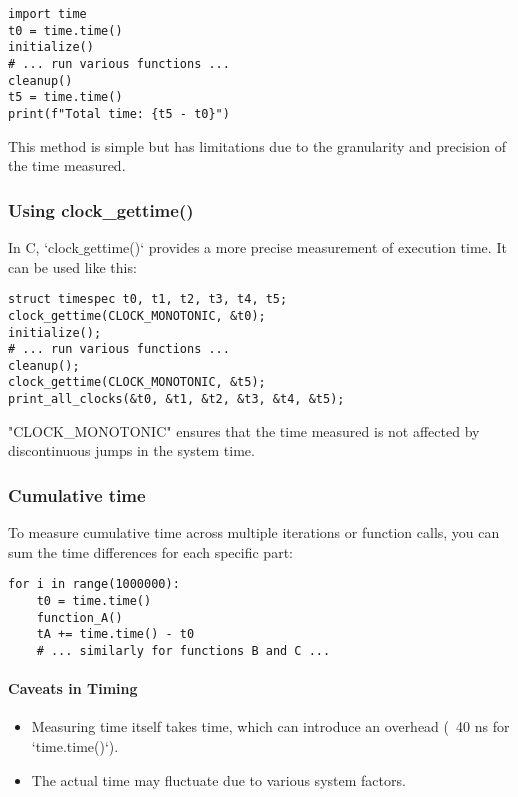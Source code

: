 \documentclass[12pt]{article}
\begin{document}
\begin{lstlisting}
import time
t0 = time.time()
initialize()
# ... run various functions ...
cleanup()
t5 = time.time()
print(f"Total time: {t5 - t0}")
\end{lstlisting}

This method is simple but has limitations due to the granularity and precision of the time measured.


\subsubsection{Using clock\_gettime()}
In C, `clock$\_$gettime()` provides a more precise measurement of execution time. It can be used like this:

\begin{lstlisting}
struct timespec t0, t1, t2, t3, t4, t5;
clock_gettime(CLOCK_MONOTONIC, &t0);
initialize();
# ... run various functions ...
cleanup();
clock_gettime(CLOCK_MONOTONIC, &t5);
print_all_clocks(&t0, &t1, &t2, &t3, &t4, &t5);
\end{lstlisting}

"CLOCK\_MONOTONIC" ensures that the time measured is not affected by discontinuous jumps in the system time.



\subsubsection{Cumulative time}
To measure cumulative time across multiple iterations or function calls, you can sum the time differences for each specific part:

\begin{lstlisting}
for i in range(1000000):
    t0 = time.time()
    function_A()
    tA += time.time() - t0
    # ... similarly for functions B and C ...
\end{lstlisting}

\paragraph{Caveats in Timing}
\begin{itemize}
    \item Measuring time itself takes time, which can introduce an overhead (~40 ns for `time.time()`).
    \item The actual time may fluctuate due to various system factors.
\end{itemize}
\end{document}

